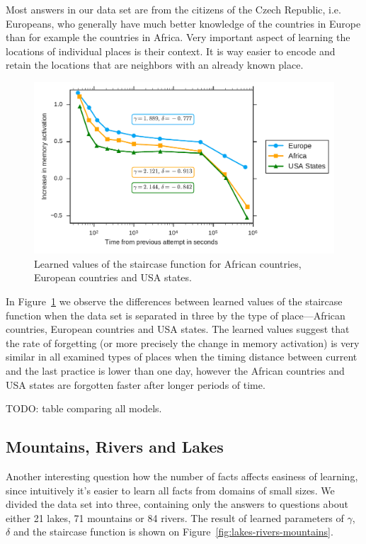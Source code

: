 Most answers in our data set are from the citizens of the Czech Republic, i.e. Europeans, who generally have much better knowledge of the countries in Europe than for example the countries in Africa. Very important aspect of learning the locations of individual places is their context. It is way easier to encode and retain the locations that are neighbors with an already known place.

\begin{figure}[htbp]
  \centering
  \includegraphics[width=\textwidth]{img/africa-europe-usa-states}
  \caption{Learned values of the staircase function for African countries, European countries and USA states.}
  \label{fig:africa-europe-usa-states}
\end{figure}

In Figure~\ref{fig:africa-europe-usa-states} we observe the differences between learned values of the staircase function when the data set is separated in three by the type of place---African countries, European countries and USA states. The learned values suggest that the rate of forgetting (or more precisely the change in memory activation) is very similar in all examined types of places when the timing distance between current and the last practice is lower than one day, however the African countries and USA states are forgotten faster after longer periods of time.

TODO: table comparing all models.

\subsection{Mountains, Rivers and Lakes}

Another interesting question how the number of facts affects easiness of learning, since intuitively it's easier to learn all facts from domains of small sizes. We divided the data set into three, containing only the answers to questions about either 21 lakes, 71 mountains or 84 rivers. The result of learned parameters of $\gamma$, $\delta$ and the staircase function is shown on Figure~\ref{fig:lakes-rivers-mountains}.

